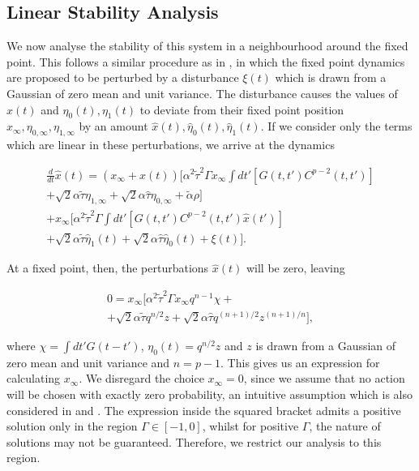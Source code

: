 \documentclass[sigconf]{aamas}
\newcommand{\talpha}{\tilde{\alpha}}
\newcommand{\ttau}{\tilde{\tau}}
\newcommand{\htau}{\hat{\tau}}
\newcommand{\xfixed}{x_\infty}
\newcommand{\ezerof}{\eta_{0, \infty}}
\newcommand{\eonef}{\eta_{1, \infty}}
\newcommand{\xpert}{\hat{x}(t)}
\newcommand{\xpertdash}{\hat{x}(t')}
\newcommand{\ezeropert}{\hat{\eta}_0(t)}
\newcommand{\eonepert}{\hat{\eta}_1(t)}
\begin{document}
\subsection{Linear Stability Analysis}

We now analyse the stability of this system in a neighbourhood around the fixed point. This follows a similar procedure as in \cite{Opper1992}, in which the fixed point dynamics are proposed to be perturbed by a disturbance $\xi(t)$ which is drawn from a Gaussian of zero mean and unit variance. The disturbance causes the values of $x(t)$ and $\eta_0(t), \eta_1(t)$ to deviate from their fixed point position $\xfixed, \ezerof, \eonef$ by an amount $\xpert, \ezeropert, \eonepert$.
If we consider only the terms which are linear in these perturbations, we arrive at the dynamics

\begin{equation}
\label{eqn::Linearised}
    \begin{split}
        \frac{d}{dt} \xpert = (\xfixed + \xpert) [ \alpha^2 \ttau^2 \Gamma \xfixed \int dt' [ G(t, t')C^{p - 2}(t, t') ]\\ + \sqrt{2} \alpha \ttau \eonef + \sqrt{2} \alpha \htau \ezerof + \talpha \rho] \\
        + \xfixed [\alpha^2 \ttau^2 \Gamma \int dt' [ G(t, t')C^{p - 2}(t, t') \xpertdash ] \\ + \sqrt{2} \alpha \ttau \eonepert + \sqrt{2} \alpha \htau \ezeropert + \xi(t)].
    \end{split}
\end{equation}

At a fixed point, then, the perturbations $\xpert$ will be zero, leaving

\begin{equation}
    \begin{split}
    \label{eqn::fixed_point}
        0 = \xfixed [ \alpha^2 \ttau^2 \Gamma \xfixed q^{n-1} \chi + \\ + \sqrt{2} \alpha \ttau q^{n/2}z + \sqrt{2} \alpha \htau q^{(n+1)/2} z^{(n+1)/n}],
    \end{split}
\end{equation}

where $\chi = \int dt' G(t - t')$, $\eta_0(t) = q^{n/2}z$ and $z$ is drawn from a Gaussian of zero mean and unit variance and $n = p - 1$. This gives us an expression for calculating $\xfixed$. We disregard the choice $\xfixed  = 0$, since we assume that no action will be chosen with exactly zero probability, an intuitive assumption which is also considered in \cite{Sanders2018} and \cite{Coolen2005}. The expression inside the squared bracket admits a positive solution only in the region $\Gamma \in [-1, 0]$, whilst for positive $\Gamma$, the nature of solutions may not be guaranteed. Therefore, we restrict our analysis to this region. 
\end{document}
